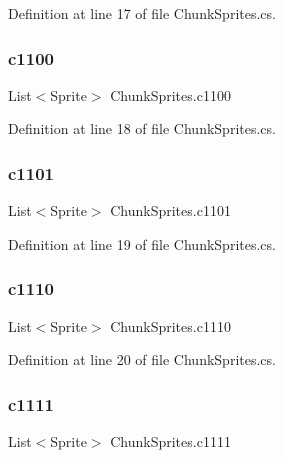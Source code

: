 Definition at line 17 of file Chunk\+Sprites.\+cs.

\mbox{\label{class_chunk_sprites_afc20b135b9cbcb7f00759a90cc5fe5aa}} 
\subsubsection{\texorpdfstring{c1100}{c1100}}
{\footnotesize\ttfamily List$<$Sprite$>$ Chunk\+Sprites.\+c1100}



Definition at line 18 of file Chunk\+Sprites.\+cs.

\mbox{\label{class_chunk_sprites_acddac083bf262cd668417a8488a0efb9}} 
\subsubsection{\texorpdfstring{c1101}{c1101}}
{\footnotesize\ttfamily List$<$Sprite$>$ Chunk\+Sprites.\+c1101}



Definition at line 19 of file Chunk\+Sprites.\+cs.

\mbox{\label{class_chunk_sprites_a2e41de104497bc5e9a531b1c281e88b5}} 
\subsubsection{\texorpdfstring{c1110}{c1110}}
{\footnotesize\ttfamily List$<$Sprite$>$ Chunk\+Sprites.\+c1110}



Definition at line 20 of file Chunk\+Sprites.\+cs.

\mbox{\label{class_chunk_sprites_a6e669d816ca0b936f893b5456958b2e1}} 
\subsubsection{\texorpdfstring{c1111}{c1111}}
{\footnotesize\ttfamily List$<$Sprite$>$ Chunk\+Sprites.\+c1111}



